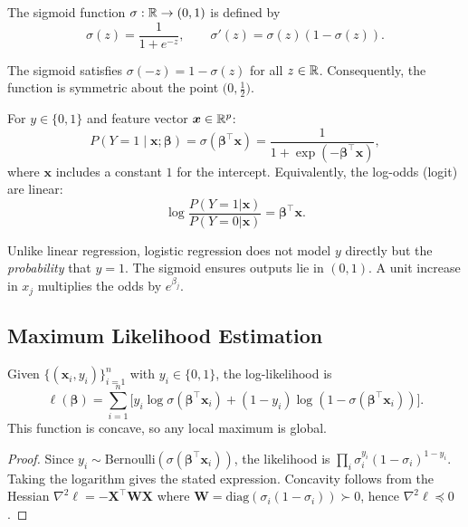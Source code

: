 \begin{definition}
The sigmoid function $\sigma : \mathbb{R} \to (0,1)$ is defined by
\[
    \sigma(z) = \frac{1}{1 + e^{-z}},
    \qquad \sigma'(z) = \sigma(z)(1 - \sigma(z)).
\]
\end{definition}

\begin{proposition}
The sigmoid satisfies $\sigma(-z) = 1 - \sigma(z)$ for all $z \in \mathbb{R}$. Consequently, the function is symmetric about the point $\bigl(0, \tfrac{1}{2}\bigr)$.
\end{proposition}

\begin{definition}
For $y \in \{0, 1\}$ and feature vector $\bm{x} \in \mathbb{R}^p$:
\[
    P(Y=1 \mid \bm{x}; \bm{\beta})
    = \sigma(\bm{\beta}^\top \bm{x})
    = \frac{1}{1 + \exp(-\bm{\beta}^\top \bm{x})},
\]
where $\bm{x}$ includes a constant $1$ for the intercept. Equivalently, the log-odds (logit) are linear:
\[
    \log\frac{P(Y=1|\bm{x})}{P(Y=0|\bm{x})} = \bm{\beta}^\top\bm{x}.
\]
\end{definition}

\begin{remark}
Unlike linear regression, logistic regression does not model $y$ directly but the \emph{probability} that $y = 1$. The sigmoid ensures outputs lie in $(0,1)$. A unit increase in $x_j$ multiplies the odds by $e^{\beta_j}$.
\end{remark}

\subsection{Maximum Likelihood Estimation}

\begin{theorem}
Given $\{(\bm{x}_i, y_i)\}_{i=1}^{n}$ with $y_i \in \{0,1\}$, the log-likelihood is
\[
    \ell(\bm{\beta})
    = \sum_{i=1}^{n} \bigl[y_i \log \sigma(\bm{\beta}^\top\bm{x}_i)
    + (1 - y_i)\log(1 - \sigma(\bm{\beta}^\top\bm{x}_i))\bigr].
\]
This function is concave, so any local maximum is global.
\end{theorem}

\begin{proof}
Since $y_i \sim \text{Bernoulli}(\sigma(\bm{\beta}^\top\bm{x}_i))$, the likelihood is $\prod_i \sigma_i^{y_i}(1-\sigma_i)^{1-y_i}$. Taking the logarithm gives the stated expression. Concavity follows from the Hessian $\nabla^2 \ell = -\bm{X}^\top \bm{W}\bm{X}$ where $\bm{W} = \text{diag}(\sigma_i(1-\sigma_i)) \succ 0$, hence $\nabla^2 \ell \preceq 0$.
\end{proof}

